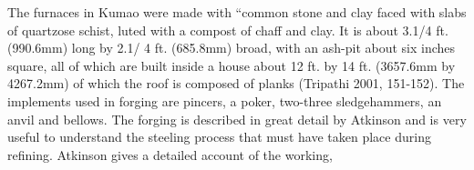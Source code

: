 
The furnaces in Kumao were made with ``common stone and clay faced with slabs of quartzose schist, luted with a compost of chaff and clay. It is about 3.1/4 ft. (990.6mm) long by 2.1/ 4 ft. (685.8mm) broad, with an ash-pit about six inches square, all of which are built inside a house about 12 ft. by 14 ft. (3657.6mm by 4267.2mm) of which the roof is composed of planks (Tripathi 2001, 151-152). The implements used in forging are pincers, a poker, two-three sledgehammers, an anvil and bellows. The forging is described in great detail by Atkinson and is very useful to understand the steeling process that must have taken place during refining. Atkinson gives a detailed account of the working,



